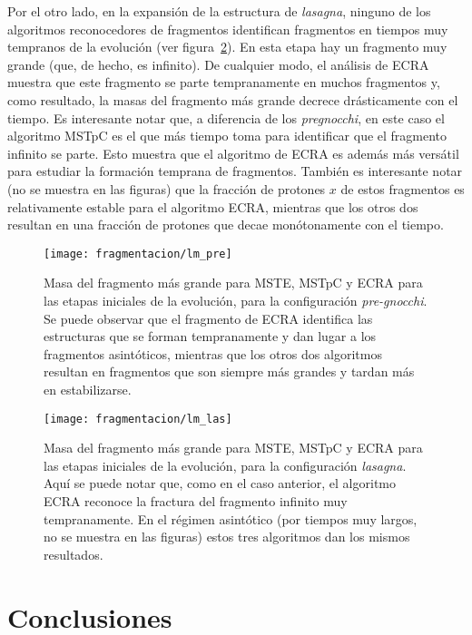 Por el otro lado, en la expansión de la estructura de \emph{lasagna}, ninguno de los algoritmos reconocedores de fragmentos identifican fragmentos en tiempos muy tempranos de la evolución (ver figura~\ref{fig:lm_las}).
En esta etapa hay un fragmento muy grande (que, de hecho, es infinito).
De cualquier modo, el análisis de ECRA muestra que este fragmento se parte tempranamente en muchos fragmentos y, como resultado, la masas del fragmento más grande decrece drásticamente con el tiempo.
Es interesante notar que, a diferencia de los \emph{pregnocchi}, en este caso el algoritmo MSTpC es el que más tiempo toma para identificar que el fragmento infinito se parte.
Esto muestra que el algoritmo de ECRA es además más versátil para estudiar la formación temprana de fragmentos.
También es interesante notar (no se muestra en las figuras) que la fracción de protones $x$ de estos fragmentos es relativamente estable para el algoritmo ECRA, mientras que los otros dos resultan en una fracción de protones que decae monótonamente con el tiempo.

\begin{figure}[H]  \centering
  \texttt{[image: fragmentacion/lm\_pre]}
  \caption{Masa del fragmento más grande para MSTE, MSTpC y ECRA para las etapas iniciales de la evolución, para la configuración \emph{pre-gnocchi}.
    Se puede observar que el fragmento de ECRA identifica las estructuras que se forman tempranamente y dan lugar a los fragmentos asintóticos, mientras que los otros dos algoritmos resultan en fragmentos que son siempre más grandes y tardan más en estabilizarse.}
\label{fig:lm_pre}
\end{figure}

\begin{figure}[H]  \centering
  \texttt{[image: fragmentacion/lm\_las]}
  \caption{Masa del fragmento más grande para MSTE, MSTpC y ECRA para las etapas iniciales de la evolución, para la configuración \emph{lasagna}.
    Aquí se puede notar que, como en el caso anterior, el algoritmo ECRA reconoce la fractura del fragmento infinito muy tempranamente.
    En el régimen asintótico (por tiempos muy largos, no se muestra en las figuras) estos tres algoritmos dan los mismos resultados.}
\label{fig:lm_las}
\end{figure}


\section{Conclusiones}


